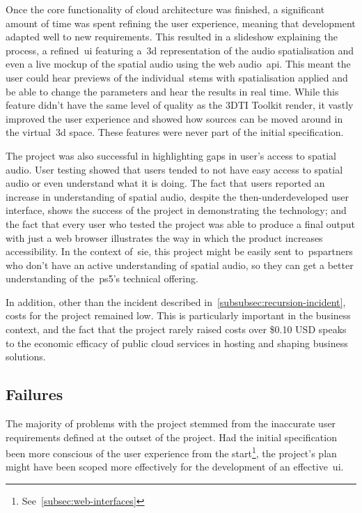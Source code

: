 Once the core functionality of cloud architecture was finished,
a significant amount of time was spent refining the user experience,
meaning that development adapted well to new requirements.
This resulted in a slideshow explaining the process,
a refined~\gls{ui} featuring a~\gls{3d} representation of the audio spatialisation and even a live mockup of the spatial audio
using the web audio~\gls{api}.
This meant the user could hear previews of the individual~\glspl{stem} with spatialisation applied
and be able to change the parameters and hear the results in real time.
While this feature didn't have the same level of quality as the 3DTI Toolkit render,
it vastly improved the user experience and showed how sources can be moved around in the virtual~\gls{3d} space.
These features were never part of the initial specification.

The project was also successful in highlighting gaps in user's access to spatial audio.
User testing showed that users tended to not have easy access to spatial audio or even understand what it is doing.
The fact that users reported an increase in understanding of spatial audio,
despite the then-underdeveloped user interface, shows the success of the project in demonstrating the technology;
and the fact
that every user who tested the project was able
to produce a final output with just a web browser illustrates the way in which the product increases accessibility.
In the context of~\gls{sie},
this project might be easily sent
to~\glspl{pspartner} who don't have an active understanding of spatial audio,
so they can get a better understanding of the~\gls{ps5}'s technical offering.

In addition, other than the incident described in~\ref{subsubsec:recursion-incident},
costs for the project remained low.
This is particularly important in the business context,
and the fact that the project rarely raised costs over \$0.10 USD speaks to the economic efficacy of public cloud services
in hosting and shaping business solutions.

\subsection{Failures}\label{subsec:failures}

The majority of problems with the project stemmed from the inaccurate user requirements
defined at the outset of the project.
Had the initial specification been more conscious of the user experience from the start\footnote{See~\ref{subsec:web-interfaces}},
the project's plan might have been scoped more effectively for the development of an effective~\gls{ui}.

